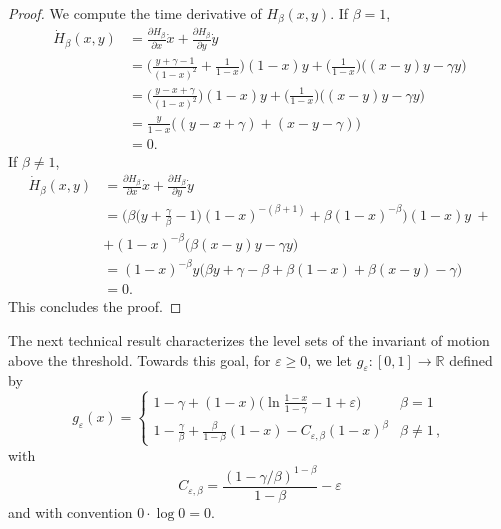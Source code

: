 \documentclass{article}
\newcommand{\R}{\mathbb R}
\begin{document}
\begin{proof}
    We compute the time derivative of $H_{\beta}(x,y)$.
    If $\beta = 1$,
    \begin{equation*}            
        \begin{aligned}
            \dot{H}_{\beta}(x,y) &= \frac{\partial H_{\beta}}{\partial x}\dot{x} + \frac{\partial H_{\beta}}{\partial y}\dot{y} \\
            &= \bigg(\frac{y + \gamma - 1}{(1 - x)^2}  + \frac{1}{1 - x}\bigg)(1-x)y + \bigg(\frac{1}{1 - x} \bigg)\big((x-y)y-\gamma y\big) \\
            &= \bigg(\frac{y - x + \gamma}{(1 - x)^2} \bigg)(1-x)y + \bigg(\frac{1}{1 - x} \bigg)\big((x-y)y-\gamma y\big) \\
            &= \frac{y}{1 - x}\big((y - x + \gamma) + (x - y - \gamma)\big) \\[3pt]
            &= 0.
        \end{aligned}
    \end{equation*}
    If $\beta \neq 1$,
    \begin{equation*}            
        \begin{aligned}
            \dot{H}_{\beta}(x,y) &= \frac{\partial H_{\beta}}{\partial x}\dot{x} + \frac{\partial H_{\beta}}{\partial y}\dot{y} \\
            &= \bigg(\beta\Big(y+\displaystyle\frac{\gamma}{\beta}-1\Big)(1-x)^{-(\beta+1)}+\beta(1-x)^{-\beta}\bigg) (1-x)y \ + \\
            & + (1 - x)^{-\beta}\big(\beta(x-y)y-\gamma y\big) \\[3pt]
            &= (1-x)^{-\beta}y\big(\beta y+\gamma-\beta+\beta(1-x)+\beta(x-y)-\gamma\big)\\[3pt]
            &= 0.
        \end{aligned}
    \end{equation*}
    This concludes the proof.
\end{proof}

The next technical result characterizes the level sets of the invariant of motion above the threshold. Towards this goal,  for $\varepsilon \ge 0$, we let $g_\varepsilon: [0,1] \to \R$ 
defined by
    \begin{equation}\label{eq:g}
        g_{\varepsilon}(x) = \begin{cases}
            1 - \gamma + (1 - x)\Big(\ln{\displaystyle\frac{1-x}{1-\gamma}-1+\varepsilon}\Big) & \beta = 1\\[7pt]
            1 - \displaystyle\frac{\gamma}{\beta}+\frac{\beta}{1 - \beta}(1 - x)-C_{\varepsilon,\beta}(1-x)^{\beta} & \beta \neq 1\,,
        \end{cases}
    \end{equation}
with
\begin{equation}\label{eq:C}
C_{\varepsilon,\beta} = \frac{(1-\gamma/\beta)^{1-\beta}}{1-\beta}-\varepsilon
\end{equation}
and with convention $0 \cdot \log 0 = 0$.
\end{document}
